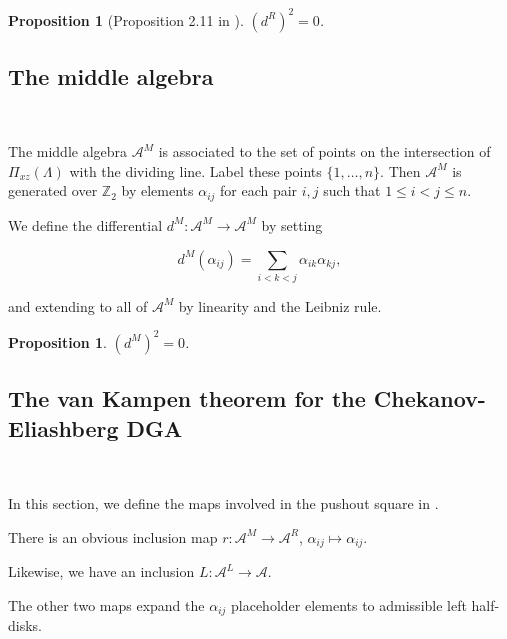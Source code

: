 \documentclass[a4paper,final, reqno]{amsart}
\theoremstyle{plain}
\newtheorem{Prop}[Th]{Proposition}
\theoremstyle{definition}
\newcommand{\A}{\mathcal{A}}
\begin{document}
	
	\begin{Prop}[Proposition 2.11 in \cite{sivek}]
		$(d^R)^2 = 0$.
	\end{Prop}
	
	
	
	
	
	\subsection{The middle algebra} \-\
	
	The middle algebra $\A^M$ is associated to the set of points on the intersection of $\Pi_{xz}(\Lambda)$ with the dividing line. Label these points $\{1,\dots, n\}$. Then $\A^M$ is generated over $\mathbb{Z}_2$ by elements $\alpha_{ij}$ for each pair $i,j$ such that  $1\leq i<j\leq n$. 
	
	We define the differential $d^M:\A^M\to \A^M$ by setting
	
	\[ d^M( \alpha_{ij} ) = \sum_{i<k<j} \alpha_{ik}\alpha_{kj}, \]
	
	and extending to all of $\A^M$ by linearity and the Leibniz rule.
	
	\begin{Prop}
		$(d^M)^2 = 0$.
	\end{Prop}
	
	
	
	
	
	\subsection{The van Kampen theorem for the Chekanov-Eliashberg DGA} \-\
	
	In this section, we define the maps involved in the pushout square in . %
	
	
	
	There is an obvious inclusion map $r: \A^M \to \A^R$,  $\alpha_{ij} \mapsto \alpha_{ij}$. 
	
	Likewise, we have an inclusion $L: \A^L \to \A$. 
	
	The other two maps expand the $\alpha_{ij}$ placeholder elements to admissible left half-disks.
	
\end{document}
